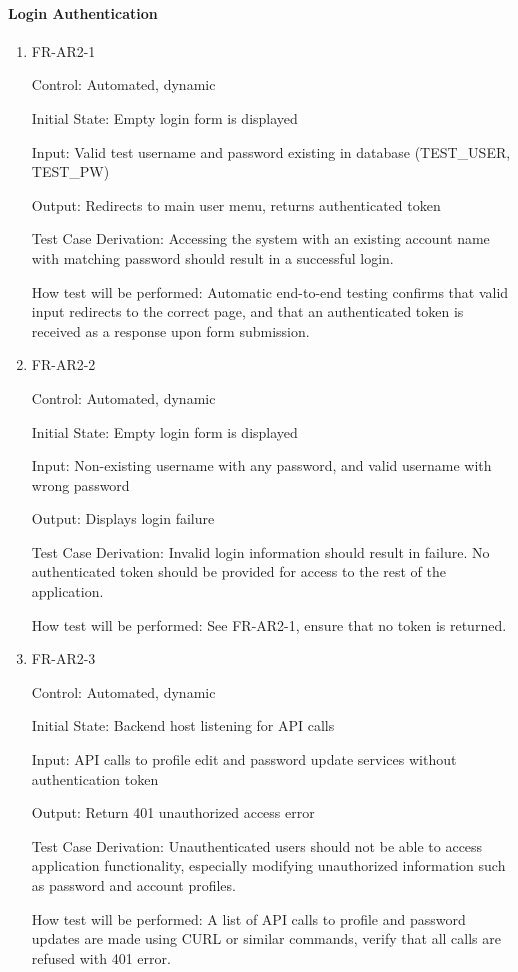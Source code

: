 \documentclass[12pt, titlepage]{article}
\begin{document}
\paragraph{Login Authentication}

\begin{enumerate}

\item{FR-AR2-1\\}

Control: Automated, dynamic
					
Initial State: Empty login form is displayed
					
Input: Valid test username and password existing in database (TEST\_USER, TEST\_PW)
					
Output: Redirects to main user menu, returns authenticated token

Test Case Derivation: Accessing the system with an existing account name with matching password should result in a successful login.
					
How test will be performed: Automatic end-to-end testing confirms that valid input redirects to the correct page, and that an authenticated token is received as a response upon form submission.

\item{FR-AR2-2\\}

Control: Automated, dynamic
					
Initial State: Empty login form is displayed
					
Input: Non-existing username with any password, and valid username with wrong password
					
Output: Displays login failure

Test Case Derivation: Invalid login information should result in failure. No authenticated token should be provided for access to the rest of the application.
					
How test will be performed: See FR-AR2-1, ensure that no token is returned.

\item{FR-AR2-3\\}

Control: Automated, dynamic
					
Initial State: Backend host listening for API calls
					
Input: API calls to profile edit and password update services without authentication token
					
Output: Return 401 unauthorized access error

Test Case Derivation: Unauthenticated users should not be able to access application functionality, especially modifying unauthorized information such as password and account profiles.
					
How test will be performed: A list of API calls to profile and password updates are made using CURL or similar commands, verify that all calls are refused with 401 error.

\end{enumerate}
\end{document}
